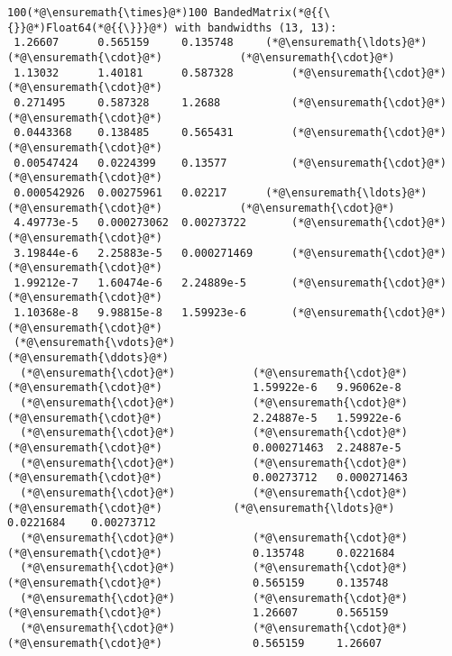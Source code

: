 \documentclass[12pt,a4paper]{article}
\begin{document}
\begin{lstlisting}
100(*@\ensuremath{\times}@*)100 BandedMatrix(*@{{\{}}@*)Float64(*@{{\}}}@*) with bandwidths (13, 13):
 1.26607      0.565159     0.135748     (*@\ensuremath{\ldots}@*)   (*@\ensuremath{\cdot}@*)            (*@\ensuremath{\cdot}@*) 
 1.13032      1.40181      0.587328         (*@\ensuremath{\cdot}@*)            (*@\ensuremath{\cdot}@*) 
 0.271495     0.587328     1.2688           (*@\ensuremath{\cdot}@*)            (*@\ensuremath{\cdot}@*) 
 0.0443368    0.138485     0.565431         (*@\ensuremath{\cdot}@*)            (*@\ensuremath{\cdot}@*) 
 0.00547424   0.0224399    0.13577          (*@\ensuremath{\cdot}@*)            (*@\ensuremath{\cdot}@*) 
 0.000542926  0.00275961   0.02217      (*@\ensuremath{\ldots}@*)   (*@\ensuremath{\cdot}@*)            (*@\ensuremath{\cdot}@*) 
 4.49773e-5   0.000273062  0.00273722       (*@\ensuremath{\cdot}@*)            (*@\ensuremath{\cdot}@*) 
 3.19844e-6   2.25883e-5   0.000271469      (*@\ensuremath{\cdot}@*)            (*@\ensuremath{\cdot}@*) 
 1.99212e-7   1.60474e-6   2.24889e-5       (*@\ensuremath{\cdot}@*)            (*@\ensuremath{\cdot}@*) 
 1.10368e-8   9.98815e-8   1.59923e-6       (*@\ensuremath{\cdot}@*)            (*@\ensuremath{\cdot}@*) 
 (*@\ensuremath{\vdots}@*)                                      (*@\ensuremath{\ddots}@*)               
  (*@\ensuremath{\cdot}@*)            (*@\ensuremath{\cdot}@*)            (*@\ensuremath{\cdot}@*)              1.59922e-6   9.96062e-8
  (*@\ensuremath{\cdot}@*)            (*@\ensuremath{\cdot}@*)            (*@\ensuremath{\cdot}@*)              2.24887e-5   1.59922e-6
  (*@\ensuremath{\cdot}@*)            (*@\ensuremath{\cdot}@*)            (*@\ensuremath{\cdot}@*)              0.000271463  2.24887e-5
  (*@\ensuremath{\cdot}@*)            (*@\ensuremath{\cdot}@*)            (*@\ensuremath{\cdot}@*)              0.00273712   0.000271463
  (*@\ensuremath{\cdot}@*)            (*@\ensuremath{\cdot}@*)            (*@\ensuremath{\cdot}@*)           (*@\ensuremath{\ldots}@*)  0.0221684    0.00273712
  (*@\ensuremath{\cdot}@*)            (*@\ensuremath{\cdot}@*)            (*@\ensuremath{\cdot}@*)              0.135748     0.0221684
  (*@\ensuremath{\cdot}@*)            (*@\ensuremath{\cdot}@*)            (*@\ensuremath{\cdot}@*)              0.565159     0.135748
  (*@\ensuremath{\cdot}@*)            (*@\ensuremath{\cdot}@*)            (*@\ensuremath{\cdot}@*)              1.26607      0.565159
  (*@\ensuremath{\cdot}@*)            (*@\ensuremath{\cdot}@*)            (*@\ensuremath{\cdot}@*)              0.565159     1.26607
\end{lstlisting}
\end{document}
